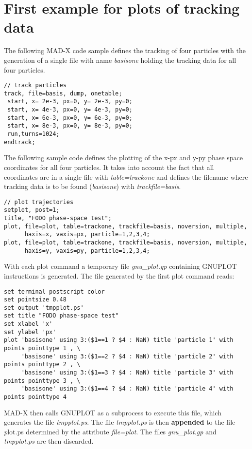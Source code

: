 \section{First example for plots of tracking data}

The following MAD-X code sample defines the tracking of four particles 
with the generation of a single file with name \textit{basisone} 
holding the tracking data for all four particles.  

\begin{verbatim}
// track particles
track, file=basis, dump, onetable;
 start, x= 2e-3, px=0, y= 2e-3, py=0;
 start, x= 4e-3, px=0, y= 4e-3, py=0;
 start, x= 6e-3, px=0, y= 6e-3, py=0;
 start, x= 8e-3, px=0, y= 8e-3, py=0;
 run,turns=1024;
endtrack;
\end{verbatim}

The following sample code defines the plotting of the x-px and y-py
phase space coordinates for all four particles. 
It takes into account the fact that all coordinates are in a single file 
with \textit{table=trackone} and defines the filename where tracking data 
is to be found (\textit{basisone}) with \textit{trackfile=basis}. 

\begin{verbatim}
// plot trajectories
setplot, post=1; 
title, "FODO phase-space test";
plot, file=plot, table=trackone, trackfile=basis, noversion, multiple, 
      haxis=x, vaxis=px, particle=1,2,3,4; 
plot, file=plot, table=trackone, trackfile=basis, noversion, multiple, 
      haxis=y, vaxis=py, particle=1,2,3,4;
\end{verbatim}

With each plot command a temporary file \textit{gnu\_plot.gp} containing
GNUPLOT instructions is generated.  
The file generated by the first plot command reads: 

{\footnotesize \begin{verbatim}  
set terminal postscript color
set pointsize 0.48
set output 'tmpplot.ps'
set title "FODO phase-space test"
set xlabel 'x'
set ylabel 'px'
plot 'basisone' using 3:($1==1 ? $4 : NaN) title 'particle 1' with points pointtype 1 , \
     'basisone' using 3:($1==2 ? $4 : NaN) title 'particle 2' with points pointtype 2 , \
     'basisone' using 3:($1==3 ? $4 : NaN) title 'particle 3' with points pointtype 3 , \
     'basisone' using 3:($1==4 ? $4 : NaN) title 'particle 4' with points pointtype 4 
\end{verbatim}}

MAD-X then calls GNUPLOT as a subprocess to execute this file, which
generates the file \textit{tmpplot.ps}.  
The file \textit{tmpplot.ps} is then {\bf appended} to the file 
{\textit plot.ps} determined by the attribute \textit{file=plot}.  
The files \textit{gnu\_plot.gp} and \textit{tmpplot.ps} are then
discarded. 

